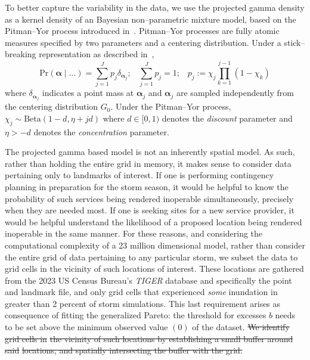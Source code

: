 To better capture the variability in the data, we use the projected gamma density 
    as a kernel density of an Bayesian non--parametric mixture model, based on 
    the Pitman--Yor process introduced in~\cite{perman1992}.  Pitman--Yor processes
    are fully atomic measures specified by two parameters and a centering
    distribution.  Under a stick--breaking representation as described 
    in~\cite{ishwaran2001}, 
    \[
        \text{Pr}(\bm{\alpha}\mid\ldots) = \sum_{j = 1}^Jp_j\delta_{\bm{\alpha}_j};\;\;\;
        \sum_{j=1}^Jp_j = 1;\;\;\;p_j := \chi_j\prod_{k = 1}^{j-1}(1 - \chi_k)  
    \]
    where $\delta_{\bm{\alpha}_j}$ indicates a point mass at $\bm{\alpha}_j$ and
    $\bm{\alpha}_j$ are sampled independently from the centering distribution $G_0$.
    Under the Pitman--Yor process, $\chi_j \sim \text{Beta}(1 - d, \eta + jd)$
    where $d \in [0, 1)$ denotes the \emph{discount} parameter and $\eta > -d$
    denotes the \emph{concentration} parameter.


The projected gamma based model is not an inherently spatial model.  As such, 
    rather than holding the entire grid in memory, it makes sense to consider 
    data pertaining only to landmarks of interest.    If one is performing 
    contingency planning in preparation for the storm season, it would be 
    helpful to know the probability of such services being rendered inoperable 
    simultaneously, precisely when they are needed most.  If one is seeking 
    sites for a new service provider, it would be helpful understand the 
    likelihood of a proposed location being rendered inoperable in the same 
    manner.  For these reasons, and considering the computational complexity of 
    a 23 million dimensional model, rather than consider the entire grid of data 
    pertaining to any particular storm, we subset the data to grid cells in the 
    vicinity of such locations of interest.  These locations are gathered from 
    the 2023 US Census Bureau's \emph{TIGER} database \needcite and specifically 
    the point and landmark file, and only grid cells that experienced \emph{some} 
    inundation in greater than 2  percent of storm 
    simulations.   This last requirement arises as consequence of fitting the 
    generalized Pareto: the threshold for excesses $b$ needs to be set above the 
    minimum observed value $(0)$ of the dataset.  
       \st{We identify grid cells in}
    \st{the vicinity of such locations by establishing a small buffer around said}
    \st{locations, and spatially intersecting the buffer with the grid.}

